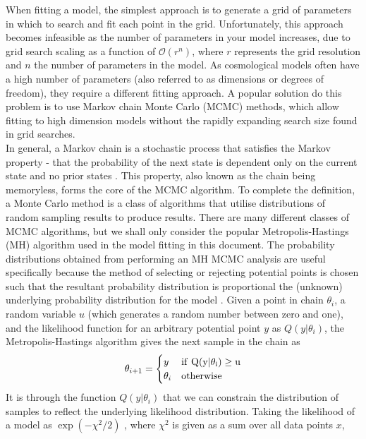 \documentclass[titlesmallcaps, examinerscopy, copyrightpage]{uqthesis}
\begin{document}
When fitting a model, the simplest approach is to generate a grid of parameters in which to search and fit each point in the grid. Unfortunately, this approach becomes infeasible as the number of parameters in your model increases, due to grid search scaling as a function of $\mathcal{O}(r^n)$, where $r$ represents the grid resolution and $n$ the number of parameters in the model.  As cosmological models often have a high number of parameters (also referred to as dimensions or degrees of freedom), they require a different fitting approach. A popular solution do this problem is to use Markov chain Monte Carlo (MCMC) methods, which allow fitting to high dimension models without the rapidly expanding search size found in grid searches.\\

In general, a Markov chain is a stochastic process that satisfies the Markov property - that the probability  of the next state is dependent only on the current state and no prior states \citep{Markov1988theory}. This property, also known as the chain being memoryless, forms the core of the MCMC algorithm. To complete the definition, a Monte Carlo method is a class of algorithms that utilise distributions of random sampling results to produce results. There are many different classes of MCMC algorithms, but we shall only consider the popular Metropolis-Hastings (MH) algorithm used in the model fitting in this document. The probability distributions obtained from performing an MH MCMC analysis are useful specifically because the method of selecting or rejecting potential points is chosen such that the resultant probability distribution is proportional the (unknown) underlying probability distribution for the model \citep{Hobson2010bayesian, Ivezic2013}. Given a point in chain $\theta_i$, a random variable $u$ (which generates a random number between zero and one), and the likelihood function for an arbitrary potential point $y$ as $Q(y|\theta_i)$, the Metropolis-Hastings algorithm gives the next sample in the chain as 
\begin{align}
\theta_{i+1} = \begin{cases}
y & \rm{if } \ Q(y|\theta_i) \geq u \\
\theta_i & \rm{otherwise}
\end{cases}
\end{align}
It is through the function $Q(y|\theta_i)$ that we can constrain the distribution of samples to reflect the underlying likelihood distribution. Taking the likelihood of a model as $\exp(-\chi^2 / 2)$ \citep{Press1992}, where $\chi^2$ is given as a sum over all data points $x$,
\end{document}
